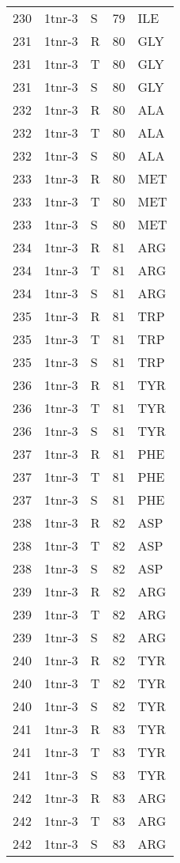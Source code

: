 \begin{longtable}[l]{l|l|l|l|l}
	230 & 1tnr-3 & S & 79 & ILE \\
	231 & 1tnr-3 & R & 80 & GLY \\
	231 & 1tnr-3 & T & 80 & GLY \\
	231 & 1tnr-3 & S & 80 & GLY \\
	232 & 1tnr-3 & R & 80 & ALA \\
	232 & 1tnr-3 & T & 80 & ALA \\
	232 & 1tnr-3 & S & 80 & ALA \\
	233 & 1tnr-3 & R & 80 & MET \\
	233 & 1tnr-3 & T & 80 & MET \\
	233 & 1tnr-3 & S & 80 & MET \\
	234 & 1tnr-3 & R & 81 & ARG \\
	234 & 1tnr-3 & T & 81 & ARG \\
	234 & 1tnr-3 & S & 81 & ARG \\
	235 & 1tnr-3 & R & 81 & TRP \\
	235 & 1tnr-3 & T & 81 & TRP \\
	235 & 1tnr-3 & S & 81 & TRP \\
	236 & 1tnr-3 & R & 81 & TYR \\
	236 & 1tnr-3 & T & 81 & TYR \\
	236 & 1tnr-3 & S & 81 & TYR \\
	237 & 1tnr-3 & R & 81 & PHE \\
	237 & 1tnr-3 & T & 81 & PHE \\
	237 & 1tnr-3 & S & 81 & PHE \\
	238 & 1tnr-3 & R & 82 & ASP \\
	238 & 1tnr-3 & T & 82 & ASP \\
	238 & 1tnr-3 & S & 82 & ASP \\
	239 & 1tnr-3 & R & 82 & ARG \\
	239 & 1tnr-3 & T & 82 & ARG \\
	239 & 1tnr-3 & S & 82 & ARG \\
	240 & 1tnr-3 & R & 82 & TYR \\
	240 & 1tnr-3 & T & 82 & TYR \\
	240 & 1tnr-3 & S & 82 & TYR \\
	241 & 1tnr-3 & R & 83 & TYR \\
	241 & 1tnr-3 & T & 83 & TYR \\
	241 & 1tnr-3 & S & 83 & TYR \\
	242 & 1tnr-3 & R & 83 & ARG \\
	242 & 1tnr-3 & T & 83 & ARG \\
	242 & 1tnr-3 & S & 83 & ARG \\

\end{longtable}
